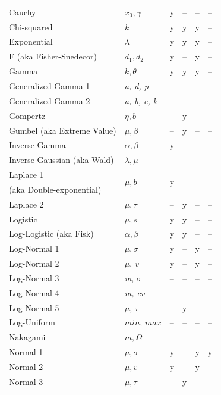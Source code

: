 {\begin{center}
\begin{longtable}{l | lcccc}
Cauchy				& $x_0, \gamma$	&	y	& --  & --  &  -- \\
Chi-squared			& \emph{k}		&	y	&	y	&	y	&  -- \\
Exponential			& $\lambda$		&	y	&	y	&	y	&  -- \\
F (aka Fisher-Snedecor)	& $d_1, d_2$		&	y	& --  &	y	&  -- \\
Gamma				& $k, \theta$		&	y	&	y	&	y	&  -- \\
Generalized Gamma 1	& \emph{a, d, p}	&	--	& --  & --  & --	  \\
Generalized Gamma 2	& \emph{a, b, c, k}	&	--	& --  & --  & --	  \\
Gompertz				& $\eta, b$		& --  &	y	& --  & --	  \\
Gumbel (aka Extreme Value)	& $\mu, \beta$	& --  &	y 	& --  & -- \\ 
Inverse-Gamma		& $\alpha, \beta$	&	y	& --  & --  &  -- \\
Inverse-Gaussian (aka Wald)	& $\lambda, \mu$	&	--	& --  & --  &  -- \\
Laplace 1				& \multirow{2}{*}{$\mu, b$} &	\multirow{2}{*}{y}	&	\multirow{2}{*}{--}	& \multirow{2}{*}{--}  & \multirow{2}{*}{--} \\ 
(aka Double-exponential) \\
Laplace 2				& $\mu, \tau$ 		&	--	&	y	& --  & -- \\ 
Logistic				& $\mu, s$		&	y	&	y	& --  &  -- \\
Log-Logistic (aka Fisk)	& $\alpha, \beta$		&	y	&	y	& --  &  -- \\
Log-Normal 1			& $\mu, \sigma$	&	y	&	--	&	y	&  -- \\
Log-Normal 2			& $\mu$, \textit{v}	&	y	&	--	&	y	&  -- \\
Log-Normal 3			& \emph{m}, $\sigma$	&	--	&	--	&	--	&  -- \\
Log-Normal 4			& \emph{m, cv}		& 	--	&	--	&	--	&  -- \\
Log-Normal 5			& $\mu$, $\tau$	& 	--	&	y	&	--	&  -- \\
Log-Uniform			& $min$, $max$	& 	--	&	--	&	--	&  -- \\
Nakagami				& $m, \Omega$	&	--	&	--	&	--	&  --  \\
Normal 1				& $\mu, \sigma$	&	y	&	--	&	y	& y  \\
Normal 2				& $\mu, v$		&	y	&	--	&	y	&  -- \\
Normal 3				& $\mu, \tau$		&	--	&	y	&	--	&  -- \\

\end{longtable}
\end{center}}
